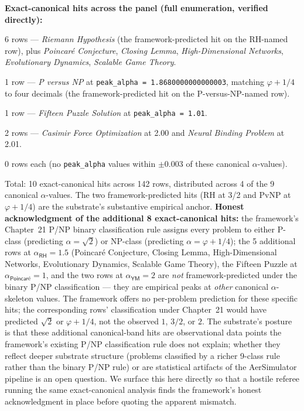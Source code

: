 \documentclass[11pt,a4paper]{amsart}
\theoremstyle{plain}
\theoremstyle{definition}
\begin{document}
\textbf{Exact-canonical hits across the panel (full enumeration, verified directly):}
\begin{description}[font=\normalfont\bfseries,leftmargin=2em,itemsep=2pt]
\item[At $\alpha_{\textsf{RH}} = 1.5$:] 6 rows --- \emph{Riemann Hypothesis} (the framework-predicted hit on the RH-named row), plus \emph{Poincar\'e Conjecture}, \emph{Closing Lemma}, \emph{High-Dimensional Networks}, \emph{Evolutionary Dynamics}, \emph{Scalable Game Theory}.
\item[At $\alpha_{\textsf{NP}} \approx 1.868$:] 1 row --- \emph{P versus NP} at \texttt{peak\_alpha = 1.8680000000000003}, matching $\varphi + 1/4$ to four decimals (the framework-predicted hit on the P-versus-NP-named row).
\item[At $\alpha_{\textsf{Poincar\'e}} = 1$:] 1 row --- \emph{Fifteen Puzzle Solution} at \texttt{peak\_alpha = 1.01}.
\item[At $\alpha_{\textsf{YM}} = 2$:] 2 rows --- \emph{Casimir Force Optimization} at 2.00 and \emph{Neural Binding Problem} at 2.01.
\item[At $\alpha_{P} = \sqrt{2}$, $\alpha_{\textsf{Hodge}} = \varphi$, $\alpha_{\textsf{BSD}} = 3\pi/4$, $\alpha_{\textsf{QG}} = \sqrt{2\pi}$, $\alpha_{\textsf{NS}} = 3\pi/2$:] 0 rows each (no \texttt{peak\_alpha} values within $\pm 0.003$ of these canonical $\alpha$-values).
\end{description}

Total: 10 exact-canonical hits across 142 rows, distributed across 4 of the 9 canonical $\alpha$-values. The two framework-predicted hits (RH at 3/2 and PvNP at $\varphi + 1/4$) are the substrate's substantive empirical anchor. \textbf{Honest acknowledgment of the additional 8 exact-canonical hits:} the framework's Chapter~21 P/NP binary classification rule assigns every problem to either P-class (predicting $\alpha = \sqrt{2}$) or NP-class (predicting $\alpha = \varphi + 1/4$); the 5 additional rows at $\alpha_{\textsf{RH}} = 1.5$ (Poincar\'e Conjecture, Closing Lemma, High-Dimensional Networks, Evolutionary Dynamics, Scalable Game Theory), the Fifteen Puzzle at $\alpha_{\textsf{Poincar\'e}} = 1$, and the two rows at $\alpha_{\textsf{YM}} = 2$ are \emph{not} framework-predicted under the binary P/NP classification --- they are empirical peaks at \emph{other} canonical $\alpha$-skeleton values. The framework offers no per-problem prediction for these specific hits; the corresponding rows' classification under Chapter~21 would have predicted $\sqrt{2}$ or $\varphi + 1/4$, not the observed $1$, $3/2$, or $2$. The substrate's posture is that these additional canonical-band hits are observational data points the framework's existing P/NP classification rule does not explain; whether they reflect deeper substrate structure (problems classified by a richer 9-class rule rather than the binary P/NP rule) or are statistical artifacts of the AerSimulator pipeline is an open question. We surface this here directly so that a hostile referee running the same exact-canonical analysis finds the framework's honest acknowledgment in place before quoting the apparent mismatch.
\end{document}
